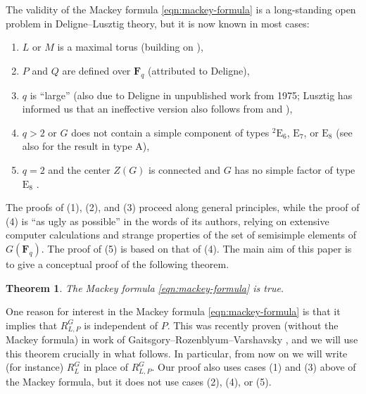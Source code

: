 \documentclass[11pt,reqno]{amsart}
\newtheorem{theorem}{Theorem}[section]
\theoremstyle{definition}
\newcommand{\F}{{\mathbf F}}
\begin{document}
The validity of the Mackey formula \eqref{eqn:mackey-formula} is a long-standing open problem in Deligne--Lusztig theory, but it is now known in most cases:
\begin{enumerate}
    \item $L$ or $M$ is a maximal torus \cite[Theorem 7]{DL83} (building on \cite[Theorem 6.8]{DL76}),
    \item $P$ and $Q$ are defined over $\F_q$ \cite[Lemma 2.5]{LS79} (attributed to Deligne),
    \item $q$ is ``large'' \cite[Th\'eor\`eme 5.1.1]{Bon98} (also due to Deligne in unpublished work from 1975; Lusztig has informed us that an ineffective version also follows from \cite{Lus85} and \cite{Lus90}),
    \item $q > 2$ or $G$ does not contain a simple component of types $^2\mathrm{E}_6$, $\mathrm{E}_7$, or $\mathrm{E}_8$ \cite[Theorem 3.9]{BM11} (see also \cite[Theorem 5.2.1]{Bon00} for the result in type A),
    \item $q = 2$ and the center $Z(G)$ is connected and $G$ has no simple factor of type $\mathrm{E}_8$ \cite[Theorem 1.6]{Tay18}.
\end{enumerate}
The proofs of (1), (2), and (3) proceed along general principles, while the proof of (4) is ``as ugly as possible'' in the words of its authors, relying on extensive computer calculations and strange properties of the set of semisimple elements of $G(\F_q)$. The proof of (5) is based on that of (4). The main aim of this paper is to give a conceptual proof of the following theorem.

\begin{theorem}\label{theorem:main}
    The Mackey formula \eqref{eqn:mackey-formula} is true.
\end{theorem}

One reason for interest in the Mackey formula \eqref{eqn:mackey-formula} is that it implies that $R_{L,P}^G$ is independent of $P$. This was recently proven (without the Mackey formula) in work of Gaitsgory--Rozenblyum--Varshavsky \cite[Theorem 8.7.2]{GRV26}, and we will use this theorem crucially in what follows. In particular, from now on we will write (for instance) $R_L^G$ in place of $R_{L,P}^G$. Our proof also uses cases (1) and (3) above of the Mackey formula, but it does not use cases (2), (4), or (5).
\end{document}
